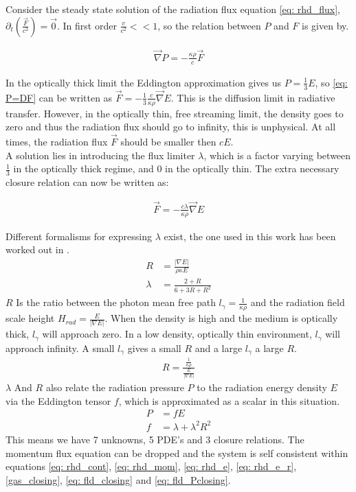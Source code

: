Consider the steady state solution of the radiation flux equation \eqref{eq: rhd_flux}, $\partial_t \left(\frac{\vec{F}}{c^2} \right) = \vec{0}$. In first order $\frac{v}{c^2} << 1$, so the relation between $P$ and $F$ is given by.

\begin{align}
\vec{\nabla} P = - \frac{\kappa \rho}{c} \vec{F} \label{eq: P=DF}
\end{align}

In the optically thick limit the Eddington approximation gives us $P = \frac{1}{3}E$, so \eqref{eq: P=DF} can be written as $\vec{F} = -\frac{1}{3}\frac{c}{\kappa \rho} \vec{\nabla}E$. This is the diffusion limit in radiative transfer. However, in the optically thin, free streaming limit, the density goes to zero and thus the radiation flux should go to infinity, this is unphysical. At all times, the radiation flux $\vec{F}$ should be smaller then $cE$.\\
 A solution lies in introducing the flux limiter $\lambda$, which is a factor varying between $\frac{1}{3}$ in the optically thick regime, and $0$ in the optically thin. The extra necessary closure relation can now be written as:

\begin{align}
\vec{F} = -\frac{c\lambda}{\kappa \rho} \vec{\nabla}E \label{eq: fld_closing}
\end{align}

Different formalisms for expressing $\lambda$ exist, the one used in this work has been worked out in \cite{Levermore1981}. 
\begin{align}
R &= \frac{|\nabla E|}{\rho \kappa E} \\
\lambda &= \frac{2 + R}{6 + 3R + R^2} 
\end{align}
$R$ Is the ratio between the photon mean free path $l_\gamma = \frac{1}{\kappa \rho}$ and the radiation field scale height $H_{rad} = \frac{E}{\left| \nabla E \right|}$. When the density is high and the medium is optically thick, $l_\gamma$ will approach zero. In a low density, optically thin environment, $l_\gamma$ will approach infinity. A small $l_\gamma$ gives a small $R$ and a large $l_\gamma$ a large $R$.
\begin{align*}
R = \frac{\frac{1}{\kappa \rho}}{\frac{E}{\left| \nabla E \right|}}
\end{align*}
$\lambda$ And $R$ also relate the radiation pressure $P$ to the radiation energy density $E$ via the Eddington tensor $f$, which is approximated as a scalar in this situation.
\begin{align}
P &= f E  \label{eq: fld_Pclosing} \\
f &= \lambda + \lambda^2 R^2
\end{align}
This means we have 7 unknowns, 5 PDE's and 3 closure relations. The momentum flux equation can be dropped and the system is self consistent within equations \eqref{eq: rhd_cont}, \eqref{eq: rhd_mom}, \eqref{eq: rhd_e}, \eqref{eq: rhd_e_r}, \eqref{gas_closing}, \eqref{eq: fld_closing} and \eqref{eq: fld_Pclosing}. \\

